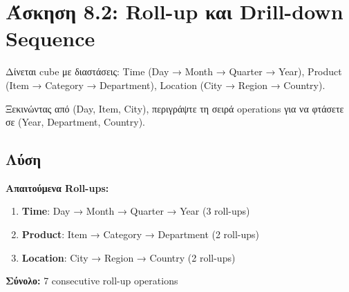 \begin{center}
\end{center}

\section{Άσκηση 8.2: Roll-up και Drill-down Sequence}

\begin{formulabox}[Εκφώνηση]
Δίνεται cube με διαστάσεις: Time (Day → Month → Quarter → Year),
Product (Item → Category → Department), Location (City → Region → Country).

Ξεκινώντας από (Day, Item, City), περιγράψτε τη σειρά operations για να φτάσετε σε
(Year, Department, Country).
\end{formulabox}

\subsection*{Λύση}

\textbf{Απαιτούμενα Roll-ups:}

\begin{enumerate}
    \item \textbf{Time}: Day → Month → Quarter → Year (3 roll-ups)
    \item \textbf{Product}: Item → Category → Department (2 roll-ups)
    \item \textbf{Location}: City → Region → Country (2 roll-ups)
\end{enumerate}

\textbf{Σύνολο:} 7 consecutive roll-up operations

